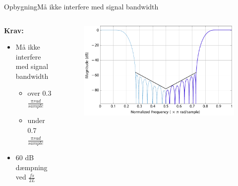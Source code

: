 \begin{frame}{Opbygning}{Må ikke interfere med signal bandwidth}
\begin{columns}
  \begin{column}{0.4\textwidth}
\textbf{Krav:}
\begin{itemize}
\item Må ikke interfere med signal bandwidth
\begin{itemize}
\item over 0.3 $\frac{\pi rad}{sample}$
\item under 0.7 $\frac{\pi rad}{sample}$
\end{itemize}
\item \alert{60 dB dæmpning ved $\frac{fs}{2L}$}
\end{itemize}
  \end{column}
  \begin{column}{0.6\textwidth}
\begin{figure}
	\centering
	\includegraphics[width=1\textwidth]{DecIntCompMirror}
\end{figure}
  \end{column}
\end{columns}
\end{frame}

